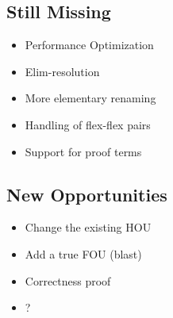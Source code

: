 \subsection{Still Missing}
\begin{frame}
  \begin{itemize}[<+->]
  	\item Performance Optimization
    \item Elim-resolution
    \item More elementary renaming
    \item Handling of flex-flex pairs
    \item Support for proof terms
  \end{itemize}
\end{frame}

\subsection{New Opportunities}
\begin{frame}
  \begin{itemize}[<+->]
	\item Change the existing HOU
    \item Add a true FOU (blast)
    \item Correctness proof
    \item ?
  \end{itemize}
\end{frame}
